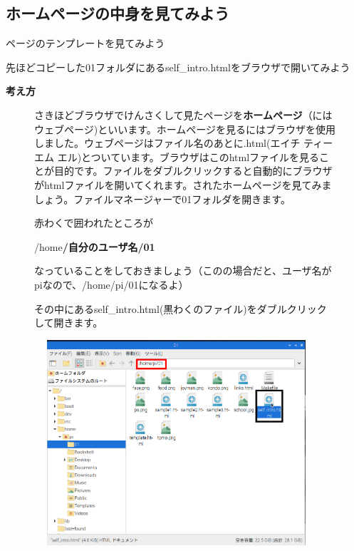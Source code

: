 \documentclass[a4paper,12pt]{jarticle}
\begin{document}
\bigskip

\clearpage
{}
\subsection{\theExercise ホームページの中身を見てみよう}
ページのテンプレートを見てみよう

先ほどコピーした01フォルダにあるself\_intro.htmlをブラウザで開いてみよう

\textbf{考え方}



\begin{figure}[hb]
  \centering
  \begin{minipage}{16.576cm}
    さきほどブラウザでけんさくして見たページを\textbf{ホームページ}（にはウェブページ)といいます。ホームページを見るにはブラウザを使用しました。ウェブページはファイル名のあとに.html(エイチ
    ティー エム
    エル)とついています。ブラウザはこのhtmlファイルを見ることが目的です。ファイルをダブルクリックすると自動的にブラウザがhtmlファイルを開いてくれます。されたホームページを見てみましょう。ファイルマネージャーで01フォルダを開きます。

    赤わくで囲われたところが

    /home\textbf{/自分のユーザ名/01}

    なっていることをしておきましょう（このの場合だと、ユーザ名がpiなので、/home/pi/01になるよ）

    その中にあるself\_intro.html(黒わくのファイル)をダブルクリックして開きます。




    \bigskip
  \end{minipage}

  \includegraphics[width=10.559cm,height=7.634cm]{textbook-img141.png}

\end{figure}
\end{document}

